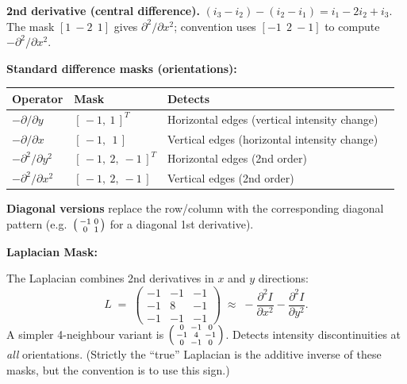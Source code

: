 \textbf{2nd derivative (central difference).} $(i_3 - i_2) - (i_2 - i_1) = i_1 - 2 i_2 + i_3$. The mask $[1\ -2\ \ 1]$ gives $\partial^2/\partial x^2$; convention uses $[-1\ \ 2\ -1]$ to compute $-\partial^2/\partial x^2$.

\separator

\textbf{Standard difference masks (orientations):}

\begin{center}
\renewcommand{\arraystretch}{1.3}
\begin{tabular}{@{} l l l l @{}}
\toprule
\textbf{Operator} & \textbf{Mask} & \textbf{Detects} \\
\midrule
$-\partial / \partial y$ & $[\,-1,\ 1\,]^T$ & Horizontal edges (vertical intensity change) \\
$-\partial / \partial x$ & $[\,-1,\ \ 1\,]$ & Vertical edges (horizontal intensity change) \\
$-\partial^2 / \partial y^2$ & $[\,-1,\ 2,\ -1\,]^T$ & Horizontal edges (2nd order) \\
$-\partial^2 / \partial x^2$ & $[\,-1,\ 2,\ -1\,]$ & Vertical edges (2nd order) \\
\bottomrule
\end{tabular}
\end{center}

\textbf{Diagonal versions} replace the row/column with the corresponding diagonal pattern (e.g.\ $\begin{psmallmatrix}-1 & 0\\ 0 & 1\end{psmallmatrix}$ for a diagonal 1st derivative).

\separator

\textbf{Laplacian Mask:}

\begin{defbox}[Laplacian]
The Laplacian combines 2nd derivatives in $x$ and $y$ directions:
\[
L \;=\; \begin{pmatrix} -1 & -1 & -1 \\ -1 & 8 & -1 \\ -1 & -1 & -1 \end{pmatrix} \;\approx\; -\frac{\partial^2 I}{\partial x^2} - \frac{\partial^2 I}{\partial y^2}.
\]
A simpler 4-neighbour variant is $\begin{psmallmatrix}0 & -1 & 0 \\ -1 & 4 & -1 \\ 0 & -1 & 0\end{psmallmatrix}$. Detects intensity discontinuities at \emph{all} orientations. (Strictly the ``true'' Laplacian is the additive inverse of these masks, but the convention is to use this sign.)
\end{defbox}

